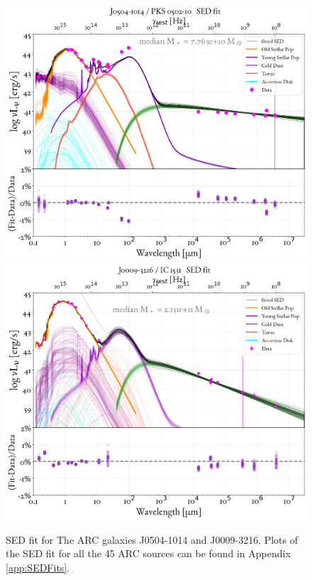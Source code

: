 \begin{figure}
    \centering
    \includegraphics[width=0.75\linewidth]{figures/ResultFits/19_SEDfit_1765.png}\\
    \includegraphics[width=0.75\linewidth]{figures/ResultFits/1_SEDfit_16.png} 
    \caption{SED fit for The ARC galaxies J0504-1014 and J0009-3216. Plots of the SED fit for all the 45 ARC sources can be found in Appendix \ref{app:SEDFits}. }
  \label{fig:SEDfit}
\end{figure}

